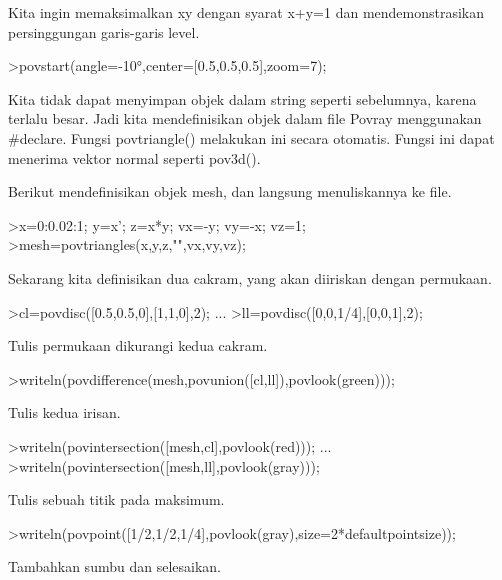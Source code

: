 \documentclass[a4paper,10pt]{article}
\begin{document}
\begin{eulernotebook}
\begin{eulercomment}
Kita ingin memaksimalkan xy dengan syarat x+y=1 dan mendemonstrasikan persinggungan garis-garis level.
\end{eulercomment}
\begin{eulerprompt}
>povstart(angle=-10°,center=[0.5,0.5,0.5],zoom=7);
\end{eulerprompt}
\begin{eulercomment}
Kita tidak dapat menyimpan objek dalam string seperti sebelumnya, karena terlalu besar. Jadi kita mendefinisikan
objek dalam file Povray menggunakan #declare. Fungsi povtriangle() melakukan ini secara otomatis. Fungsi ini dapat
menerima vektor normal seperti pov3d().

Berikut mendefinisikan objek mesh, dan langsung menuliskannya ke file.
\end{eulercomment}
\begin{eulerprompt}
>x=0:0.02:1; y=x'; z=x*y; vx=-y; vy=-x; vz=1;
>mesh=povtriangles(x,y,z,"",vx,vy,vz);
\end{eulerprompt}
\begin{eulercomment}
Sekarang kita definisikan dua cakram, yang akan diiriskan dengan permukaan.
\end{eulercomment}
\begin{eulerprompt}
>cl=povdisc([0.5,0.5,0],[1,1,0],2); ...
>ll=povdisc([0,0,1/4],[0,0,1],2);
\end{eulerprompt}
\begin{eulercomment}
Tulis permukaan dikurangi kedua cakram.
\end{eulercomment}
\begin{eulerprompt}
>writeln(povdifference(mesh,povunion([cl,ll]),povlook(green)));
\end{eulerprompt}
\begin{eulercomment}
Tulis kedua irisan.
\end{eulercomment}
\begin{eulerprompt}
>writeln(povintersection([mesh,cl],povlook(red))); ...
>writeln(povintersection([mesh,ll],povlook(gray)));
\end{eulerprompt}
\begin{eulercomment}
Tulis sebuah titik pada maksimum.
\end{eulercomment}
\begin{eulerprompt}
>writeln(povpoint([1/2,1/2,1/4],povlook(gray),size=2*defaultpointsize));
\end{eulerprompt}
\begin{eulercomment}
Tambahkan sumbu dan selesaikan.
\end{eulercomment}

\end{eulernotebook}
\end{document}

